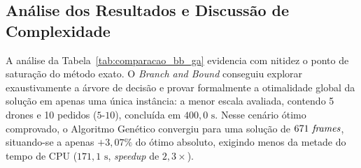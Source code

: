 \begin{table}[htbp]
\centering
\small
\caption{Comparação de desempenho e custo computacional entre o \textit{Branch and Bound} (B\&B) e o Algoritmo Genético (GA).}\label{tab:comparacao_bb_ga}
\end{table}

\subsection*{Análise dos Resultados e Discussão de Complexidade}

A análise da Tabela~\ref{tab:comparacao_bb_ga} evidencia com nitidez o ponto de saturação do método exato. O \textit{Branch and Bound} conseguiu explorar exaustivamente a árvore de decisão e provar formalmente a otimalidade global da solução em apenas uma única instância: a menor escala avaliada, contendo 5 drones e 10 pedidos ($5\text{-}10$), concluída em $400{,}0\text{ s}$. Nesse cenário ótimo comprovado, o Algoritmo Genético convergiu para uma solução de $671\text{ \textit{frames}}$, situando-se a apenas $+3{,}07\%$ do ótimo absoluto, exigindo menos da metade do tempo de CPU ($171{,}1\text{ s}$, \textit{speedup} de $2{,}3\times$).

